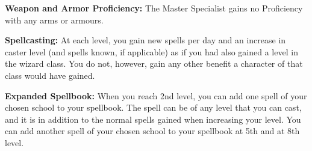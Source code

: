 \begin{extraclasstable}{}
\end{extraclasstable}

\classfeatures

\textbf{Weapon and Armor Proficiency:} The Master Specialist gains no Proficiency with any arms or armours.

\textbf{Spellcasting:} At each level, you gain new spells per day and an increase in caster level (and spells known, if applicable) as if you had also gained a level in the wizard class. You do not, however, gain any other benefit a character of that class would have gained.

\textbf{Expanded Spellbook:} When you reach 2nd level, you can add one spell of your chosen school to your spellbook. The spell can be of any level that you can cast, and it is in addition to the normal spells gained when increasing your level. You can add another spell of your chosen school to your spellbook at 5th and at 8th level.

